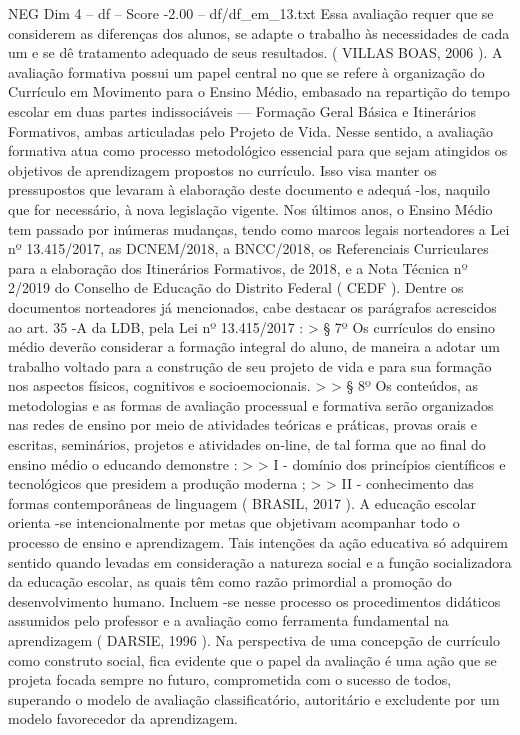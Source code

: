 \begin{textsample}{NEG Dim 4 – df – Score -2.00 – df/df\_em\_13.txt}
Essa avaliação requer que se considerem as diferenças dos alunos, se adapte o trabalho às necessidades de cada um e se dê tratamento adequado de seus resultados. ( VILLAS BOAS, 2006 ).
A avaliação formativa possui um papel central no que se refere à organização do Currículo em Movimento para o Ensino Médio, embasado na repartição do tempo escolar em duas partes indissociáveis — Formação Geral Básica e Itinerários Formativos, ambas articuladas pelo Projeto de Vida.
Nesse sentido, a avaliação formativa atua como processo metodológico essencial para que sejam atingidos os objetivos de aprendizagem propostos no currículo.
Isso visa manter os pressupostos que levaram à elaboração deste documento e adequá -los, naquilo que for necessário, à nova legislação vigente.
Nos últimos anos, o Ensino Médio tem passado por inúmeras mudanças, tendo como marcos legais norteadores a Lei nº 13.415/2017, as DCNEM/2018, a BNCC/2018, os Referenciais Curriculares para a elaboração dos Itinerários Formativos, de 2018, e a Nota Técnica nº 2/2019 do Conselho de Educação do Distrito Federal ( CEDF ).
Dentre os documentos norteadores já mencionados, cabe destacar os parágrafos acrescidos ao art. 35 -A da LDB, pela Lei nº 13.415/2017 : > § 7º Os currículos do ensino médio deverão considerar a formação integral do aluno, de maneira a adotar um trabalho voltado para a construção de seu projeto de vida e para sua formação nos aspectos físicos, cognitivos e socioemocionais. > > § 8º Os conteúdos, as metodologias e as formas de avaliação processual e formativa serão organizados nas redes de ensino por meio de atividades teóricas e práticas, provas orais e escritas, seminários, projetos e atividades on-line, de tal forma que ao final do ensino médio o educando demonstre : > > I - domínio dos princípios científicos e tecnológicos que presidem a produção moderna ; > > II - conhecimento das formas contemporâneas de linguagem ( BRASIL, 2017 ).
A educação escolar orienta -se intencionalmente por metas que objetivam acompanhar todo o processo de ensino e aprendizagem.
Tais intenções da ação educativa só adquirem sentido quando levadas em consideração a natureza social e a função socializadora da educação escolar, as quais têm como razão primordial a promoção do desenvolvimento humano.
Incluem -se nesse processo os procedimentos didáticos assumidos pelo professor e a avaliação como ferramenta fundamental na aprendizagem ( DARSIE, 1996 ).
Na perspectiva de uma concepção de currículo como construto social, fica evidente que o papel da avaliação é uma ação que se projeta focada sempre no futuro, comprometida com o sucesso de todos, superando o modelo de avaliação classificatório, autoritário e excludente por um modelo favorecedor da aprendizagem.

\end{textsample}
